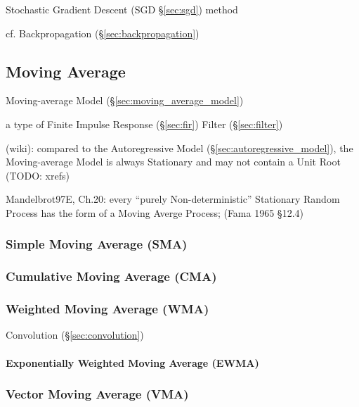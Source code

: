 Stochastic Gradient Descent (SGD \S\ref{sec:sgd}) method

cf. Backpropagation (\S\ref{sec:backpropagation})



\subsection{Moving Average}\label{sec:moving_average}

Moving-average Model (\S\ref{sec:moving_average_model})

a type of Finite Impulse Response (\S\ref{sec:fir}) Filter (\S\ref{sec:filter})

(wiki): compared to the Autoregressive Model (\S\ref{sec:autoregressive_model}),
the Moving-average Model is always Stationary and may not contain a Unit Root
(TODO: xrefs)

Mandelbrot97E, Ch.20:
every ``purely Non-deterministic'' Stationary Random Process has the form of a
Moving Averge Process; (Fama 1965 \S 12.4)



\subsubsection{Simple Moving Average (SMA)}\label{sec:sma}

\subsubsection{Cumulative Moving Average (CMA)}\label{sec:cma}

\subsubsection{Weighted Moving Average (WMA)}\label{sec:wma}

Convolution (\S\ref{sec:convolution})



\paragraph{Exponentially Weighted Moving Average (EWMA)}\label{sec:ewma}\hfill



\subsubsection{Vector Moving Average (VMA)}\label{sec:vma}

